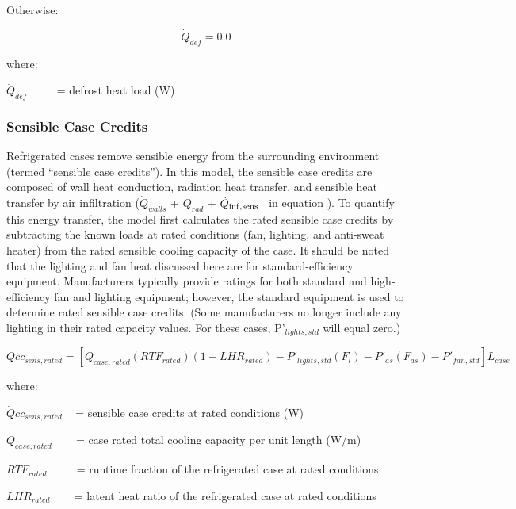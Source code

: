 Otherwise:

\begin{equation}  
  \dot{Q}_{def} = 0.0
\end{equation}

where:

\({\dot Q_{def}}\) ~~~~ = defrost heat load (W)

\subsubsection{Sensible Case Credits}\label{sensible-case-credits}

Refrigerated cases remove sensible energy from the surrounding environment (termed ``sensible case credits''). In this model, the sensible case credits are composed of wall heat conduction, radiation heat transfer, and sensible heat transfer by air infiltration (\({\dot Q_{walls}}\) + \({\dot Q_{rad}}\) + \({\dot Q_{{\rm{inf,sens}}}}\) ~in equation ). To quantify this energy transfer, the model first calculates the rated sensible case credits by subtracting the known loads at rated conditions (fan, lighting, and anti-sweat heater) from the rated sensible cooling capacity of the case. It should be noted that the lighting and fan heat discussed here are for standard-efficiency equipment. Manufacturers typically provide ratings for both standard and high-efficiency fan and lighting equipment; however, the standard equipment is used to determine rated sensible case credits. (Some manufacturers no longer include any lighting in their rated capacity values. For these cases, P'\(_{lights,std}\) will equal zero.)

\begin{equation}
\dot Qc{c_{sens,rated}} = \left[ {{{\dot Q}_{case,rated}}\left( {RT{F_{rated}}} \right)\left( {1 - LH{R_{rated}}} \right) - {P'}_{lights,std}\left( {{F_l}} \right) - {P'}_{as}\left( {{F_{as}}} \right) - {P'}_{fan,std}} \right]{L_{case}}
\end{equation}

where:

\(\dot Qc{c_{sens,rated}}\) ~ = sensible case credits at rated conditions (W)

\({\dot Q_{case,rated}}\) ~~~ = case rated total cooling capacity per unit length (W/m)

\(RT{F_{rated}}\) ~~~~ = runtime fraction of the refrigerated case at rated conditions

\(LH{R_{rated}}\) ~~~ = latent heat ratio of the refrigerated case at rated conditions

